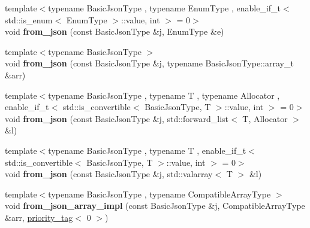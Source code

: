 \begin{DoxyCompactItemize}
\item 
\mbox{\label{namespacenlohmann_1_1detail_a5440d650150d01e8015133521351b459}} 
{\footnotesize template$<$typename Basic\+Json\+Type , typename Enum\+Type , enable\+\_\+if\+\_\+t$<$ std\+::is\+\_\+enum$<$ Enum\+Type $>$\+::value, int $>$  = 0$>$ }\\void {\bfseries from\+\_\+json} (const Basic\+Json\+Type \&j, Enum\+Type \&e)
\item 
\mbox{\label{namespacenlohmann_1_1detail_abc62958462b916726b89f25fa381a129}} 
{\footnotesize template$<$typename Basic\+Json\+Type $>$ }\\void {\bfseries from\+\_\+json} (const Basic\+Json\+Type \&j, typename Basic\+Json\+Type\+::array\+\_\+t \&arr)
\item 
\mbox{\label{namespacenlohmann_1_1detail_a5cfb765aad92795abd7fda29d017272a}} 
{\footnotesize template$<$typename Basic\+Json\+Type , typename T , typename Allocator , enable\+\_\+if\+\_\+t$<$ std\+::is\+\_\+convertible$<$ Basic\+Json\+Type, T $>$\+::value, int $>$  = 0$>$ }\\void {\bfseries from\+\_\+json} (const Basic\+Json\+Type \&j, std\+::forward\+\_\+list$<$ T, Allocator $>$ \&l)
\item 
\mbox{\label{namespacenlohmann_1_1detail_a3df497b1d3977f071b488ecac1401517}} 
{\footnotesize template$<$typename Basic\+Json\+Type , typename T , enable\+\_\+if\+\_\+t$<$ std\+::is\+\_\+convertible$<$ Basic\+Json\+Type, T $>$\+::value, int $>$  = 0$>$ }\\void {\bfseries from\+\_\+json} (const Basic\+Json\+Type \&j, std\+::valarray$<$ T $>$ \&l)
\item 
\mbox{\label{namespacenlohmann_1_1detail_ac53673a5ce29fb69b96d41dad33cb3b0}} 
{\footnotesize template$<$typename Basic\+Json\+Type , typename Compatible\+Array\+Type $>$ }\\void {\bfseries from\+\_\+json\+\_\+array\+\_\+impl} (const Basic\+Json\+Type \&j, Compatible\+Array\+Type \&arr, \mbox{\hyperlink{structnlohmann_1_1detail_1_1priority__tag}{priority\+\_\+tag}}$<$ 0 $>$)
\item 
\mbox{\label{namespacenlohmann_1_1detail_a57f93ed57254a1639087cdc316e0fb83}} 

\end{DoxyCompactItemize}
